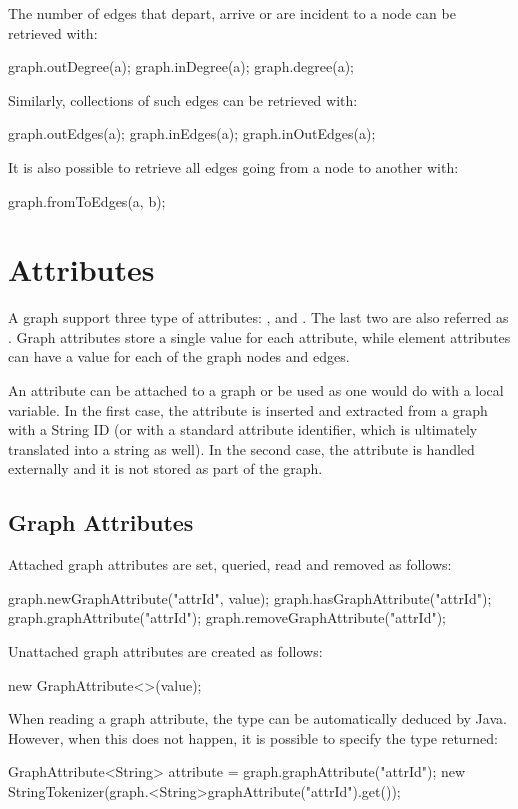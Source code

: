 The number of edges that depart, arrive or are incident to a node can be retrieved with:  
\begin{java}
graph.outDegree(a);
graph.inDegree(a);
graph.degree(a);
\end{java}
Similarly, collections of such edges can be retrieved with:
\begin{java}
graph.outEdges(a);
graph.inEdges(a);
graph.inOutEdges(a);
\end{java}

It is also possible to retrieve all edges going from a node to another with:
\begin{java}
graph.fromToEdges(a, b);
\end{java}


\section{Attributes}
A graph support three type of attributes: ,  and . The last two are also referred as . Graph attributes store a single value for each attribute, while element attributes can have a value for each of the graph nodes and edges.

An attribute can be attached to a graph or be used as one would do with a local variable. In the first case, the attribute is inserted and extracted from a graph with a String ID (or with a standard attribute identifier, which is ultimately translated into a string as well). In the second case, the attribute is handled externally and it is not stored as part of the graph.

\subsection{Graph Attributes}
Attached graph attributes are set, queried, read and removed as follows:
\begin{java}
graph.newGraphAttribute("attrId", value);
graph.hasGraphAttribute("attrId");
graph.graphAttribute("attrId");
graph.removeGraphAttribute("attrId");
\end{java}

Unattached graph attributes are created as follows:
\begin{java}
new GraphAttribute<>(value);
\end{java}

When reading a graph attribute, the type can be automatically deduced by Java. However, when this does not happen, it is possible to specify the type returned:
\begin{java}
GraphAttribute<String> attribute = graph.graphAttribute("attrId");
new StringTokenizer(graph.<String>graphAttribute("attrId").get());
\end{java}

